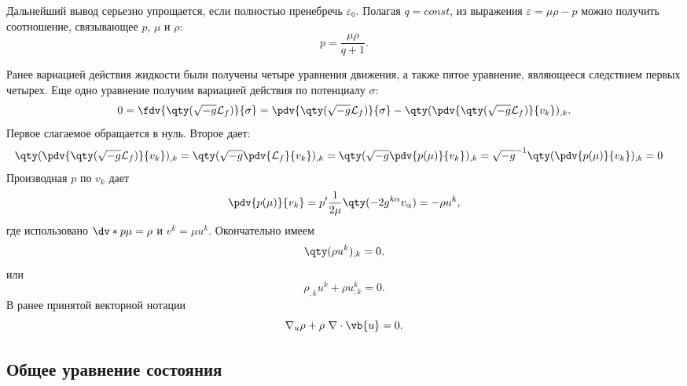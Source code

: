 \documentclass[\docroot/reports/draft/report.tex]{subfiles}
\begin{document}
    Дальнейший вывод серьезно упрощается, если полностью пренебречь $\varepsilon_0$. Полагая $q = const$, из выражения $\varepsilon = \mu\rho - p$ можно получить соотношение, связывающее $p$, $\mu$ и $\rho$:
    \begin{equation}
        p = \frac{\mu\rho}{q + 1} .
    \end{equation}

    Ранее вариацией действия жидкости были получены четыре уравнения движения, а также пятое уравнение, являющееся следствием первых четырех. Еще одно уравнение получим вариацией действия по потенциалу $\sigma$:
    \begin{equation*}
        0 = \fdv{\qty(\sqrt{-g} \mathcal{L}_f)}{\sigma} =
            \pdv{\qty(\sqrt{-g} \mathcal{L}_f)}{\sigma} -
            \qty(\pdv{\qty(\sqrt{-g} \mathcal{L}_f)}{v_k})_{,k} .
    \end{equation*}
    Первое слагаемое обращается в нуль. Второе дает:
    \begin{equation*}\begin{aligned}
        \qty(\pdv{\qty(\sqrt{-g} \mathcal{L}_f)}{v_k})_{,k} &=
        \qty(\sqrt{-g} \pdv{\mathcal{L}_f}{v_k})_{,k} =
        \qty(\sqrt{-g} \pdv{p(\mu)}{v_k})_{,k} =
        \sqrt{-g}^{-1} \qty(\pdv{p(\mu)}{v_k})_{;k} = 0
    \end{aligned}\end{equation*}
    Производная $p$ по $v_k$ дает
    \begin{equation*}
        \pdv{p(\mu)}{v_k} = p' \frac{1}{2 \mu} \qty(- 2 g^{k\alpha} v_\alpha) = - \rho u^k ,
    \end{equation*}
    где использовано $\dv*{p}{\mu} = \rho$ и $v^k = \mu u^k$. Окончательно имеем
    \begin{equation*}
        \qty(\rho u^k)_{;k} = 0 ,
    \end{equation*}
    или
    \begin{equation*}
        \rho_{,k} u^k + \rho u^k_{;k} = 0 .
    \end{equation*}
    В ранее принятой векторной нотации
    \begin{equation}
        \nabla_u \rho + \rho\ \nabla \cdot \vb{u} = 0 .
    \end{equation}

\subsection{Общее уравнение состояния}
\end{document}
